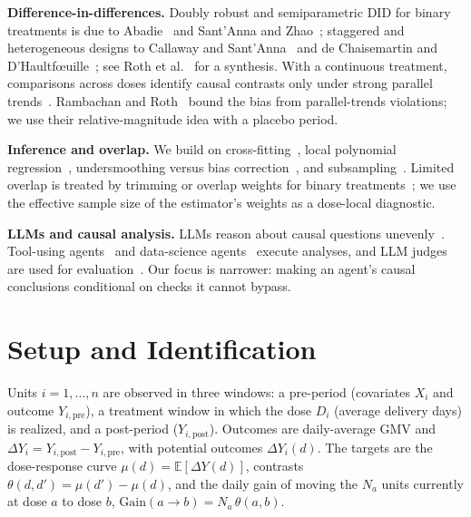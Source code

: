 \documentclass[sigconf,anonymous,review]{acmart}
\begin{document}
\textbf{Difference-in-differences.} Doubly robust and semiparametric DID for binary treatments is due to Abadie~\cite{abadie2005semiparametric} and Sant'Anna and Zhao~\cite{santanna2020doubly}; staggered and heterogeneous designs to Callaway and Sant'Anna~\cite{callaway2021multiple} and de Chaisemartin and D'Haultf\oe uille~\cite{dechaisemartin2020two}; see Roth et al.~\cite{roth2023trending} for a synthesis. With a continuous treatment, comparisons across doses identify causal contrasts only under strong parallel trends~\cite{callaway2024difference}. Rambachan and Roth~\cite{rambachan2023more} bound the bias from parallel-trends violations; we use their relative-magnitude idea with a placebo period.

\textbf{Inference and overlap.} We build on cross-fitting~\cite{chernozhukov2018double}, local polynomial regression~\cite{fan1996local}, undersmoothing versus bias correction~\cite{calonico2018effect}, and subsampling~\cite{politis1999subsampling}. Limited overlap is treated by trimming or overlap weights for binary treatments~\cite{crump2009dealing,li2018balancing}; we use the effective sample size of the estimator's weights as a dose-local diagnostic.

\textbf{LLMs and causal analysis.} LLMs reason about causal questions unevenly~\cite{kiciman2023causal,jin2023cladder,jin2024corr2cause,zecevic2023causal}. Tool-using agents~\cite{yao2023react,schick2023toolformer} and data-science agents~\cite{hong2024data} execute analyses, and LLM judges are used for evaluation~\cite{zheng2023judging}. Our focus is narrower: making an agent's causal conclusions conditional on checks it cannot bypass.

\section{Setup and Identification}\label{sec:setup}

Units $i=1,\dots,n$ are observed in three windows: a pre-period (covariates $X_i$ and outcome $Y_{i,\mathrm{pre}}$), a treatment window in which the dose $D_i$ (average delivery days) is realized, and a post-period ($Y_{i,\mathrm{post}}$). Outcomes are daily-average GMV and $\Delta Y_i = Y_{i,\mathrm{post}}-Y_{i,\mathrm{pre}}$, with potential outcomes $\Delta Y_i(d)$. The targets are the dose-response curve $\mu(d)=\mathbb{E}[\Delta Y(d)]$, contrasts $\theta(d,d')=\mu(d')-\mu(d)$, and the daily gain of moving the $N_a$ units currently at dose $a$ to dose $b$, $\mathrm{Gain}(a\to b)=N_a\,\theta(a,b)$.
\end{document}
